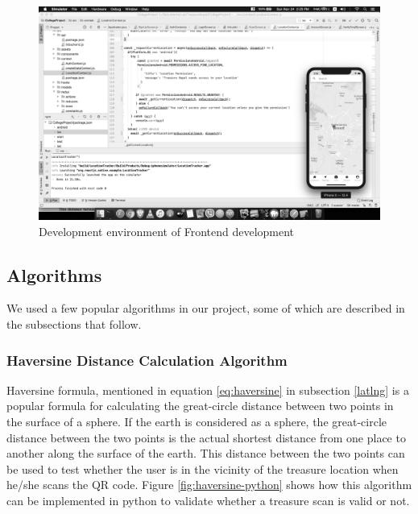 \documentclass[12pt, a4paper, oneside]{article}
\begin{document}
\begin{figure}[H]
\includegraphics[width=\linewidth, keepaspectratio]{ide/frontend.png}
\centering
\caption{Development environment of Frontend development}
\label{fig:frontend-ide}
\end{figure}

\subsection{Algorithms}
We used a few popular algorithms in our project, some of which are described in the subsections that follow.

\subsubsection{Haversine Distance Calculation Algorithm}
Haversine formula, mentioned in equation \ref{eq:haversine} in subsection \ref{latlng} is a popular formula for calculating the great-circle distance between two points in the surface of a sphere. If the earth is considered as a sphere, the great-circle distance between the two points is the actual shortest distance from one place to another along the surface of the earth. This distance between the two points can be used to test whether the user is in the vicinity of the treasure location when he/she scans the QR code. Figure \ref{fig:haversine-python} shows how this algorithm can be implemented in python to validate whether a treasure scan is valid or not.
\end{document}
